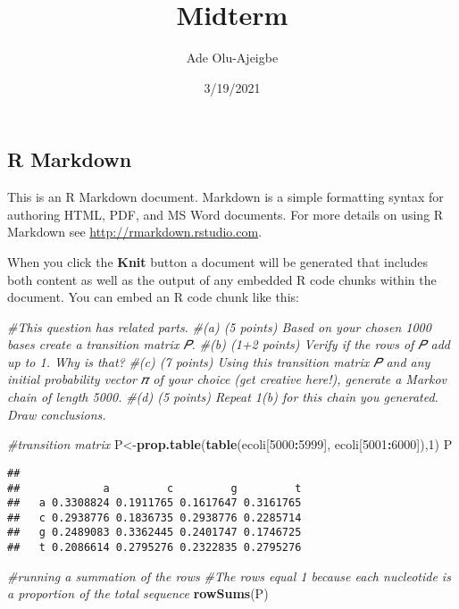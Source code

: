 \documentclass[
]{article}
\title{Midterm}
\author{Ade Olu-Ajeigbe}
\date{3/19/2021}
\newenvironment{Shaded}{\begin{snugshade}}{\end{snugshade}}
\newcommand{\CommentTok}[1]{\textcolor[rgb]{0.56,0.35,0.01}{\textit{#1}}}
\newcommand{\DecValTok}[1]{\textcolor[rgb]{0.00,0.00,0.81}{#1}}
\newcommand{\KeywordTok}[1]{\textcolor[rgb]{0.13,0.29,0.53}{\textbf{#1}}}
\newcommand{\NormalTok}[1]{#1}
\newcommand{\OperatorTok}[1]{\textcolor[rgb]{0.81,0.36,0.00}{\textbf{#1}}}
\begin{document}
\maketitle

\hypertarget{r-markdown}{%
\subsection{R Markdown}\label{r-markdown}}

This is an R Markdown document. Markdown is a simple formatting syntax
for authoring HTML, PDF, and MS Word documents. For more details on
using R Markdown see \url{http://rmarkdown.rstudio.com}.

When you click the \textbf{Knit} button a document will be generated
that includes both content as well as the output of any embedded R code
chunks within the document. You can embed an R code chunk like this:

\begin{Shaded}
\begin{Highlighting}[]
\CommentTok{#This question has related parts.}
\CommentTok{#(a) (5 points) Based on your chosen 1000 bases create a transition matrix 𝑃.}
\CommentTok{#(b) (1+2 points) Verify if the rows of 𝑃 add up to 1. Why is that?}
\CommentTok{#(c) (7 points) Using this transition matrix 𝑃 and any initial probability vector 𝜋 of your choice (get creative here!), generate a Markov chain of length 5000.}
\CommentTok{#(d) (5 points) Repeat 1(b) for this chain you generated. Draw conclusions.}



\CommentTok{#transition matrix}
\NormalTok{P<-}\KeywordTok{prop.table}\NormalTok{(}\KeywordTok{table}\NormalTok{(ecoli[}\DecValTok{5000}\OperatorTok{:}\DecValTok{5999}\NormalTok{], ecoli[}\DecValTok{5001}\OperatorTok{:}\DecValTok{6000}\NormalTok{]),}\DecValTok{1}\NormalTok{)}
\NormalTok{P}
\end{Highlighting}
\end{Shaded}

\begin{verbatim}
##    
##             a         c         g         t
##   a 0.3308824 0.1911765 0.1617647 0.3161765
##   c 0.2938776 0.1836735 0.2938776 0.2285714
##   g 0.2489083 0.3362445 0.2401747 0.1746725
##   t 0.2086614 0.2795276 0.2322835 0.2795276
\end{verbatim}

\begin{Shaded}
\begin{Highlighting}[]
\CommentTok{#running a summation of the rows}
\CommentTok{#The rows equal 1 because each nucleotide is a proportion of the total sequence}
\KeywordTok{rowSums}\NormalTok{(P)}
\end{Highlighting}
\end{Shaded}
\end{document}
